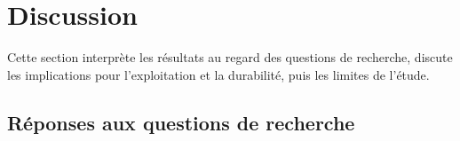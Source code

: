 \documentclass[11pt,a4paper]{article}
\begin{document}
\section{Discussion}
\label{sec:discussion}

Cette section interprète les résultats au regard des questions de recherche, discute les implications pour l'exploitation et la durabilité, puis les limites de l'étude.

\subsection{Réponses aux questions de recherche}
\end{document}
